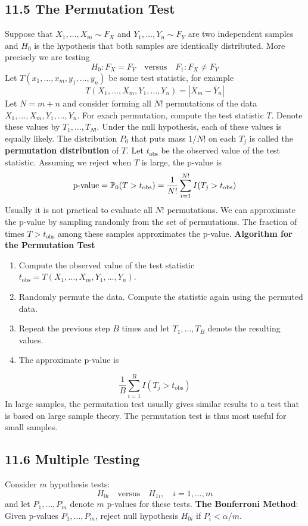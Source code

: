 \subsection*{11.5 The Permutation Test}\label{the-permutation-test}
Suppose that \(X_{1}, \dots, X_m \sim F_X\) and
\(Y_{1}, \dots, Y_{n} \sim F_Y\) are two independent samples and \(H_{0}\) is
the hypothesis that both samples are identically distributed. More
precisely we are testing
\[
H_{0}: F_X = F_Y \quad \text{versus} \quad F_{1}: F_X \neq F_Y
\]
Let \(T(x_{1}, \dots, x_m, y_{1}, \dots, y_{n})\) be some test statistic, for
example
\[
T(X_{1}, \dots, X_m, Y_{1}, \dots, Y_{n}) = | \bar{X}_m - \bar{Y}_{n} |
\]
Let \(N = m + n\) and consider forming all \(N!\) permutations of the
data \(X_{1}, \dots, X_m, Y_{1}, \dots, Y_{n}\). For exach permutation,
compute the test statistic \(T\). Denote these values by
\(T_{1}, \dots, T_{N!}\). Under the null hypothesis, each of these values
is equally likely. The distribution \(P_{0}\) that puts mass \(1 / N!\) on
each \(T_{j}\) is called the \textbf{permutation distribution} of \(T\).
Let \(t_\text{obs}\) be the observed value of the test statistic.
Assuming we reject when \(T\) is large, the p-value is
\[
\text{p-value} = \operatorname{\mathbb{P}}_{0}(T > t_\text{obs}) = \frac{1}{N!} \sum_{i=1}^{N!} I(T_{j} > t_\text{obs})
\]
Usually it is not practical to evaluate all \(N!\) permutations. We can
approximate the p-value by sampling randomly from the set of
permutations. The fraction of times \(T > t_\text{obs}\) among these
samples approximates the p-value.
\textbf{Algorithm for the Permutation Test}
\begin{enumerate}[label={\arabic*.}]
\item
  Compute the observed value of the test statistic
  \(t_\text{obs} = T(X_{1}, \dots, X_m, Y_{1}, \dots, Y_{n})\).
\item
  Randomly permute the data. Compute the statistic again using the
  permuted data.
\item
  Repeat the previous step \(B\) times and let \(T_{1}, \dots, T_B\)
  denote the resulting values.
\item
  The approximate p-value is
\end{enumerate}
\[
\frac{1}{B} \sum_{i=1}^B I(T_{j} > t_\text{obs})
\]
In large samples, the permutation test usually gives similar results to
a test that is based on large sample theory. The permutation test is
thus most useful for small samples.

\subsection*{11.6 Multiple Testing}\label{multiple-testing}
Consider \(m\) hypothesis tests:
\[
H_{0i} \quad \text{versus} \quad H_{1i}, \quad i = 1, \dots, m
\]
and let \(P_{1}, \dots, P_m\) denote \(m\) p-values for these tests.
\textbf{The Bonferroni Method}: Given p-values \(P_{1}, \dots, P_m\),
reject null hypothesis \(H_{0i}\) if \(P_{i} < \alpha / m\).

